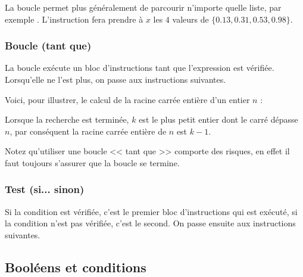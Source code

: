 \documentclass[class=report,crop=false]{standalone}
\begin{document}
La boucle  permet plus généralement de parcourir n'importe quelle liste,
par exemple \codeinline{[0.13,0.31,0.53,0.98]}. 
L'instruction  fera prendre à $x$ les $4$ valeurs
de $\{0.13 , 0.31, 0.53, 0.98\}$.

\subsubsection*{Boucle  (tant que)}



La boucle  exécute un bloc d'instructions 
tant que l'expression  est vérifiée. Lorsqu'elle ne l'est plus, on passe
aux instructions suivantes.


Voici, pour illustrer, le calcul de la racine carrée entière d'un entier $n$ : 

Lorsque la recherche est terminée, $k$ est le plus petit entier dont le carré dépasse $n$, 
par conséquent la racine carrée entière de $n$ est $k-1$.

Notez qu'utiliser une boucle << tant que >> comporte des risques, en effet
il faut toujours s'assurer que la boucle se termine.



\subsubsection*{Test  (si... sinon)} 
 

Si la condition est vérifiée, c'est le premier bloc d'instructions qui est exécuté,
si la condition n'est pas vérifiée, c'est le second. 
On passe ensuite aux instructions suivantes.


\subsection{Booléens et conditions}
\end{document}
